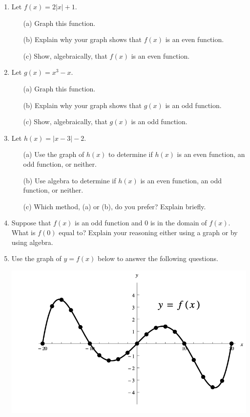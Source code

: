\documentclass[12pt]{amsart}
\begin{document}
\begin{enumerate}
\item Let $f(x) = 2 | x | +1$.

\begin{itemize}
\item[(a)] Graph this function.
\item[(b)] Explain why your graph shows that $f(x)$ is an even function.
\item[(c)] Show, algebraically, that $f(x)$ is an even function.
\end{itemize}

\item Let $g(x) = x^3-x$.

\begin{itemize}
\item[(a)] Graph this function.
\item[(b)] Explain why your graph shows that $g(x)$ is an odd function.
\item[(c)] Show, algebraically, that $g(x)$ is an odd function.
\end{itemize}

\item Let $h(x) = |x-3| - 2$.
\begin{itemize}
\item[(a)] Use the graph of $h(x)$ to determine if $h(x)$ is an even function, an odd function, or neither.
\item[(b)] Use algebra to determine if $h(x)$ is an even function, an odd function, or neither.
\item[(c)] Which method, (a) or (b), do you prefer? Explain briefly. 
\end{itemize}

\item Suppose that $f(x)$ is an odd function and $0$ is in the domain of $f(x)$. What is $f(0)$ equal to? Explain your reasoning either using a graph or by using algebra. 
\eject

\item Use the graph of $y = f(x)$ below to answer the following questions.

\includegraphics[scale=.7]{graph_for_problem_3.png}


\end{enumerate}
\end{document}
